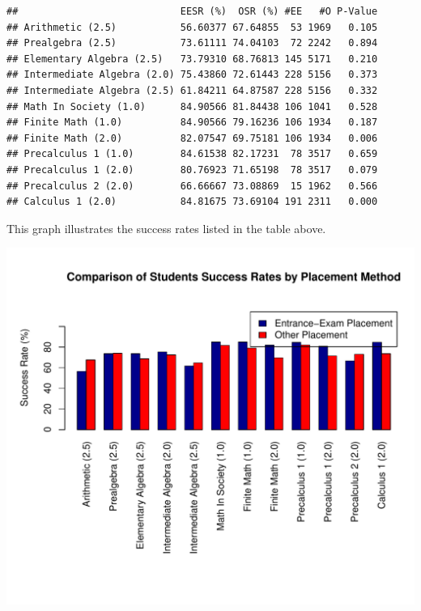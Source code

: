 \documentclass[twoside]{article}\usepackage[]{graphicx}\usepackage[]{color}
\makeatletter
\def\maxwidth{ %
  \ifdim\Gin@nat@width>\linewidth
    \linewidth
  \else
    \Gin@nat@width
  \fi
}
\newenvironment{kframe}{%
 \def\at@end@of@kframe{}%
 \ifinner\ifhmode%
  \def\at@end@of@kframe{\end{minipage}}%
  \begin{minipage}{\columnwidth}%
 \fi\fi%
 \def\FrameCommand##1{\hskip\@totalleftmargin \hskip-\fboxsep
 \colorbox{shadecolor}{##1}\hskip-\fboxsep
     \hskip-\linewidth \hskip-\@totalleftmargin \hskip\columnwidth}%
 \MakeFramed {\advance\hsize-\width
   \@totalleftmargin\z@ \linewidth\hsize
   \@setminipage}}%
 {\par\unskip\endMakeFramed%
 \at@end@of@kframe}
\newenvironment{knitrout}{}{} %
\makeatother
\begin{document}
\begin{knitrout}
\color{fgcolor}\begin{kframe}
\begin{verbatim}
##                            EESR (%)  OSR (%) #EE   #O P-Value
## Arithmetic (2.5)           56.60377 67.64855  53 1969   0.105
## Prealgebra (2.5)           73.61111 74.04103  72 2242   0.894
## Elementary Algebra (2.5)   73.79310 68.76813 145 5171   0.210
## Intermediate Algebra (2.0) 75.43860 72.61443 228 5156   0.373
## Intermediate Algebra (2.5) 61.84211 64.87587 228 5156   0.332
## Math In Society (1.0)      84.90566 81.84438 106 1041   0.528
## Finite Math (1.0)          84.90566 79.16236 106 1934   0.187
## Finite Math (2.0)          82.07547 69.75181 106 1934   0.006
## Precalculus 1 (1.0)        84.61538 82.17231  78 3517   0.659
## Precalculus 1 (2.0)        80.76923 71.65198  78 3517   0.079
## Precalculus 2 (2.0)        66.66667 73.08869  15 1962   0.566
## Calculus 1 (2.0)           84.81675 73.69104 191 2311   0.000
\end{verbatim}
\end{kframe}
\end{knitrout}


This graph illustrates the success rates listed in the table above.


\begin{knitrout}
\color{fgcolor}
\includegraphics[width=\maxwidth]{figure/success-graphs-1} 

\end{knitrout}
\end{document}
